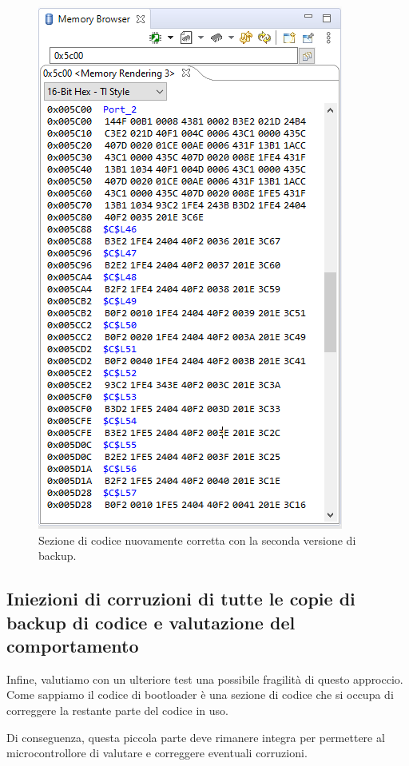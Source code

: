 \documentclass[LaM,binding=0.6cm]{../sapthesis}
\begin{document}
\begin{figure}[htbp]
\centerline{\includegraphics[scale=0.55]{examples/BootloaderTestCorruzioni3.PNG}}
\caption{Sezione di codice nuovamente corretta con la seconda versione di backup.}
\label{fig}
\end{figure}
\newline

\subsection{Iniezioni di corruzioni di tutte le copie di backup di codice e valutazione del comportamento }

Infine, valutiamo con un ulteriore test una possibile fragilità di questo approccio. Come sappiamo il codice di bootloader è una sezione di codice che si occupa di correggere la restante parte del
codice in uso.

Di conseguenza, questa piccola parte deve rimanere integra per permettere al microcontrollore di valutare e correggere eventuali corruzioni.
\end{document}
